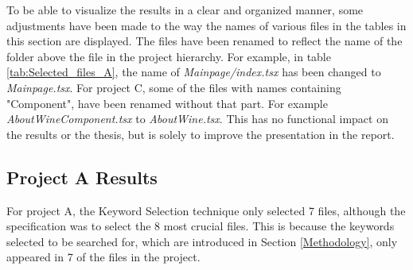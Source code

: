 To be able to visualize the results in a clear and organized manner, some adjustments have been made to the way the names of various files in the tables in this section are displayed. The files have been renamed to reflect the name of the folder above the file in the project hierarchy. For example, in table \ref{tab:Selected_files_A}, the name of \textit{Mainpage/index.tsx} has been changed to \textit{Mainpage.tsx}. For project C, some of the files with names containing "Component", have been renamed without that part. For example \textit{AboutWineComponent.tsx} to \textit{AboutWine.tsx}. This has no functional impact on the results or the thesis, but is solely to improve the presentation in the report.


\subsection{Project A Results}
For project A, the Keyword Selection technique only selected 7 files, although the specification was to select the 8 most crucial files. This is because the keywords selected to be searched for, which are introduced in Section \ref{Methodology}, only appeared in 7 of the files in the project. 


